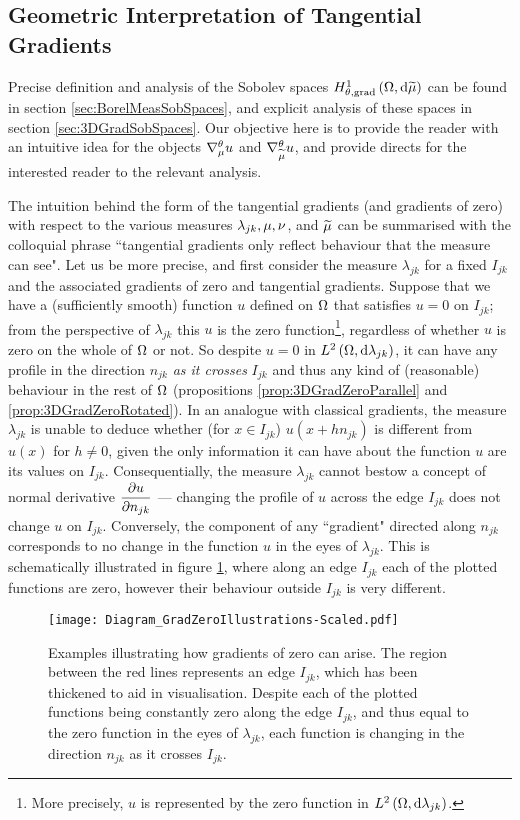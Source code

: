 \subsection{Geometric Interpretation of Tangential Gradients} \label{ssec:3DGradGeometric}
Precise definition and analysis of the Sobolev spaces $H^1_{\theta, \mathrm{grad}}\left( \Omega, \mathrm{d}\widetilde{\mu} \right)$ can be found in section \ref{sec:BorelMeasSobSpaces}, and explicit analysis of these spaces in section \ref{sec:3DGradSobSpaces}.
Our objective here is to provide the reader with an intuitive idea for the objects $\nabla^{\theta}_{\mu}u$ and $\nabla^{\theta}_{\widetilde{\mu}}u$, and provide directs for the interested reader to the relevant analysis.

The intuition behind the form of the tangential gradients (and gradients of zero) with respect to the various measures $\lambda_{jk}, \mu, \nu$, and $\widetilde{\mu}$ can be summarised with the colloquial phrase ``tangential gradients only reflect behaviour that the measure can see".
Let us be more precise, and first consider the measure $\lambda_{jk}$ for a fixed $I_{jk}$ and the associated gradients of zero and tangential gradients.
Suppose that we have a (sufficiently smooth) function $u$ defined on $\Omega$ that satisfies $u=0$ on $I_{jk}$; from the perspective of $\lambda_{jk}$ this $u$ is the zero function\footnote{More precisely, $u$ is represented by the zero function in $L^{2}\left( \Omega,\mathrm{d} \lambda_{jk} \right)$.}, regardless of whether $u$ is zero on the whole of $\Omega$ or not.
So despite $u=0$ in $L^{2}\left( \Omega,\mathrm{d} \lambda_{jk} \right)$, it can have any profile in the direction $n_{jk}$ \emph{as it crosses} $I_{jk}$ and thus any kind of (reasonable) behaviour in the rest of $\Omega$ (propositions \ref{prop:3DGradZeroParallel} and \ref{prop:3DGradZeroRotated}).
In an analogue with classical gradients, the measure $\lambda_{jk}$ is unable to deduce whether (for $x\in I_{jk}$) $u(x+hn_{jk})$ is different from $u(x)$ for $h\neq0$, given the only information it can have about the function $u$ are its values on $I_{jk}$.
Consequentially, the measure $\lambda_{jk}$ cannot bestow a concept of normal derivative $\dfrac{\partial u}{\partial n_{jk}}$ --- changing the profile of $u$ across the edge $I_{jk}$ does not change $u$ on $I_{jk}$.
Conversely, the component of any ``gradient" directed along $n_{jk}$ corresponds to no change in the function $u$ in the eyes of $\lambda_{jk}$.
This is schematically illustrated in figure \ref{fig:Diagram_GradZeroIllustrations}, where along an edge $I_{jk}$ each of the plotted functions are zero, however their behaviour outside $I_{jk}$ is very different.
\begin{figure}[b!]
	\centering
	\texttt{[image: Diagram\_GradZeroIllustrations-Scaled.pdf]}
	\caption[Illustration of how gradients of zero can arise from functions that are not almost-everywhere zero.]{\label{fig:Diagram_GradZeroIllustrations} Examples illustrating how gradients of zero can arise. The region between the red lines represents an edge $I_{jk}$, which has been thickened to aid in visualisation. Despite each of the plotted functions being constantly zero along the edge $I_{jk}$, and thus equal to the zero function in the eyes of $\lambda_{jk}$, each function is changing in the direction $n_{jk}$ as it crosses $I_{jk}$.}
\end{figure}

